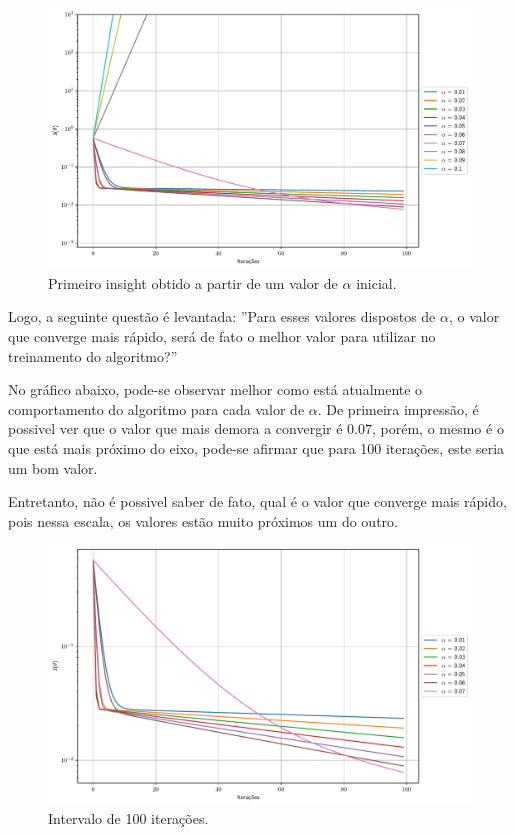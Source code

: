 \documentclass[a4paper, 12pt]{article}
\begin{document}
\begin{figure}[!h]
    \centering
    \includegraphics[width=1\textwidth]{../imgs/overflow_insights.pdf}
    \caption{Primeiro insight obtido a partir de um valor de $\alpha$ inicial.}
    \label{fig:overflow_insights}
\end{figure}

Logo, a seguinte questão é levantada: ''Para esses valores dispostos de $\alpha$, o valor que converge mais rápido,
será de fato o melhor valor para utilizar no treinamento do algoritmo?''
\clearpage

No gráfico abaixo, pode-se observar melhor como está atualmente o comportamento do algoritmo para cada
valor de $\alpha$. De primeira impressão, é possivel ver que o valor que mais demora a convergir é $0.07$, porém,
o mesmo é o que está mais próximo do eixo, pode-se afirmar que para 100 iterações, este seria um bom valor.

Entretanto, não é possivel saber de fato, qual é o valor que converge mais rápido, pois nessa escala, os valores
estão muito próximos um do outro.
\begin{figure}[!h]
    \centering
    \includegraphics[width=.8\textwidth]{../imgs/lr_100it.pdf}
    \caption{Intervalo de 100 iterações.}
    \label{fig:lr_100it}
\end{figure}
\end{document}
